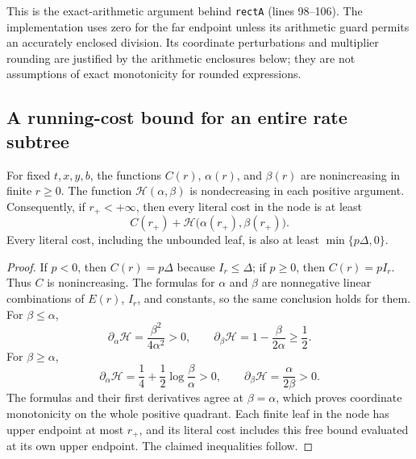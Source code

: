 This is the exact-arithmetic argument behind \texttt{rectA}
(lines 98--106).  The implementation uses zero for the far endpoint
unless its arithmetic guard permits an accurately enclosed division.
Its coordinate perturbations and multiplier rounding are justified by
the arithmetic enclosures below; they are not assumptions of exact
monotonicity for rounded expressions.

\subsection{A running-cost bound for an entire rate subtree}
\label{sec:cert-iid-cost}

\begin{lemma}
\label{lem:cert-iid-free}
For fixed $t,x,y,b$, the functions $C(r)$, $\alpha(r)$, and $\beta(r)$
are nonincreasing in finite $r\ge0$.  The function
$\mathcal H(\alpha,\beta)$ is nondecreasing in each positive argument.
Consequently, if $r_+<+\infty$, then every literal cost in the node is
at least
\begin{equation}
 C(r_+)+\mathcal H\bigl(\alpha(r_+),\beta(r_+)\bigr).
 \label{eq:cert-iid-node-free}
\end{equation}
Every literal cost, including the unbounded leaf, is also at least
$\min\{p\Delta,0\}$.
\end{lemma}
\begin{proof}
If $p<0$, then $C(r)=p\Delta$ because $I_r\le\Delta$; if $p\ge0$,
then $C(r)=pI_r$.  Thus $C$ is nonincreasing.  The formulas for $\alpha$
and $\beta$ are nonnegative linear combinations of $E(r)$, $I_r$, and
constants, so the same conclusion holds for them.  For $\beta\le\alpha$,
\[
 \partial_\alpha \mathcal H=\frac{\beta^2}{4\alpha^2}>0,
 \qquad \partial_\beta \mathcal H=1-\frac{\beta}{2\alpha}\ge\frac12.
\]
For $\beta\ge\alpha$,
\[
 \partial_\alpha \mathcal H=\frac14+\frac12\log\frac\beta\alpha>0,
 \qquad \partial_\beta \mathcal H=\frac\alpha{2\beta}>0.
\]
The formulas and their first derivatives agree at $\beta=\alpha$, which
proves coordinate monotonicity on the whole positive quadrant.  Each
finite leaf in the node has upper endpoint at most $r_+$, and its
literal cost includes this free bound evaluated at its own upper
endpoint.  The claimed inequalities follow.
\end{proof}

